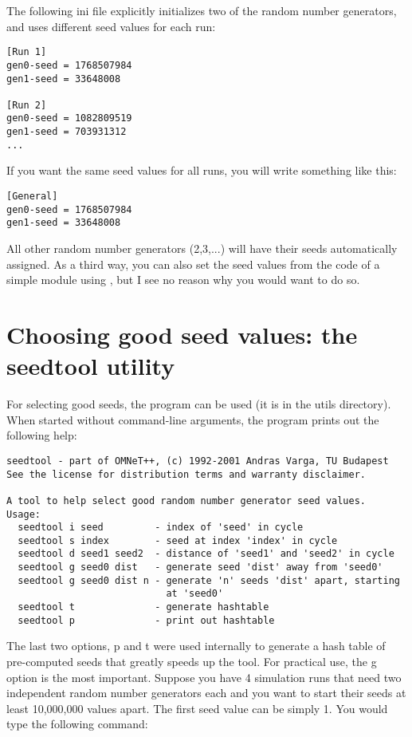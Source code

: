 The following ini file explicitly initializes two of the random
number generators, and uses different seed values for each run:

\begin{verbatim}
[Run 1]
gen0-seed = 1768507984
gen1-seed = 33648008

[Run 2]
gen0-seed = 1082809519
gen1-seed = 703931312
...
\end{verbatim}


If you want the same seed values for all runs, you will write
something like this:

\begin{verbatim}
[General]
gen0-seed = 1768507984
gen1-seed = 33648008
\end{verbatim}


All other random number generators (2,3,...) will have their seeds
automatically assigned.  As a third way, you can also set the seed
values from the code of a simple module using
, but I see no reason why you would want to do
so.


\section{Choosing good seed values: the seedtool utility}
\label{sec:ch-run-sim:choosing-good-seed}

For selecting good seeds, the  program can be used (it
is in the utils directory). When started without command-line
arguments, the program prints out the following help:

\begin{verbatim}
seedtool - part of OMNeT++, (c) 1992-2001 Andras Varga, TU Budapest
See the license for distribution terms and warranty disclaimer.

A tool to help select good random number generator seed values.
Usage:
  seedtool i seed         - index of 'seed' in cycle
  seedtool s index        - seed at index 'index' in cycle
  seedtool d seed1 seed2  - distance of 'seed1' and 'seed2' in cycle
  seedtool g seed0 dist   - generate seed 'dist' away from 'seed0'
  seedtool g seed0 dist n - generate 'n' seeds 'dist' apart, starting
                            at 'seed0'
  seedtool t              - generate hashtable
  seedtool p              - print out hashtable
\end{verbatim}


The last two options, p and t were used internally to generate
a hash table of pre-computed seeds that greatly speeds up the
tool. For practical use, the g option is the most important.
Suppose you have 4 simulation runs that need two independent
random number generators each and you want to start their seeds
at least 10,000,000 values apart. The first seed value can be
simply 1. You would type the following command:

